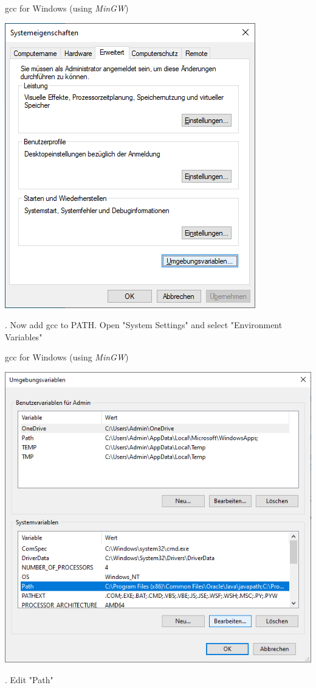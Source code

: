 \begin{frame}{gcc for Windows (using \textit{MinGW})}
	\centerline{\includegraphics[scale=.45]{../img/install/path/properties.png}}
	. Now add gcc to PATH. Open "System Settings" and select "Environment Variables"
\end{frame}

\begin{frame}{gcc for Windows (using \textit{MinGW})}
	\centerline{\includegraphics[scale=.35]{../img/install/path/edit.png}}
	. Edit "Path"
\end{frame}

